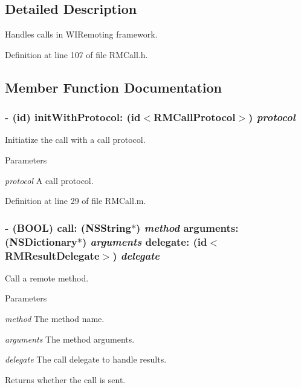 \subsection{Detailed Description}
Handles calls in WIRemoting framework. 

Definition at line 107 of file RMCall.h.

\subsection{Member Function Documentation}
\hypertarget{interface_r_m_call_a64f1e76758d2d473859064c5b0c6c75d}{
\subsubsection[{initWithProtocol:}]{\setlength{\rightskip}{0pt plus 5cm}-\/ (id) initWithProtocol: (id$<${\bf RMCallProtocol}$>$) {\em protocol}}}
\label{interface_r_m_call_a64f1e76758d2d473859064c5b0c6c75d}


Initiatize the call with a call protocol. 
\begin{DoxyParams}{Parameters}
\item[{\em protocol}]A call protocol. \end{DoxyParams}


Definition at line 29 of file RMCall.m.\hypertarget{interface_r_m_call_a85bb3ac47600a313105a6f94c9ab7ec3}{
\subsubsection[{call:arguments:delegate:}]{\setlength{\rightskip}{0pt plus 5cm}-\/ (BOOL) call: (NSString$\ast$) {\em method}\/ arguments: (NSDictionary$\ast$) {\em arguments}\/ delegate: (id$<${\bf RMResultDelegate}$>$) {\em delegate}}}
\label{interface_r_m_call_a85bb3ac47600a313105a6f94c9ab7ec3}


Call a remote method. 
\begin{DoxyParams}{Parameters}
\item[{\em method}]The method name. \item[{\em arguments}]The method arguments. \item[{\em delegate}]The call delegate to handle results.\end{DoxyParams}
\begin{DoxyReturn}{Returns}
whether the call is sent. 
\end{DoxyReturn}


